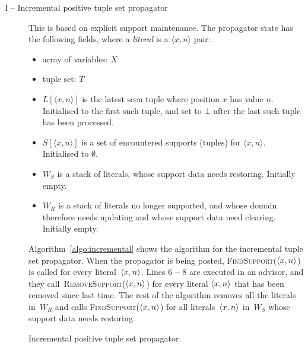 \documentclass[a4paper,11pt]{article}
\newcommand{\Algoref}[1]{Algorithm~\ref{#1}}
\newcommand{\Extensional}{\Constraint{Extensional}~}
\newcommand{\FOREACH}[1]{\FORALL{{#1} \textbf{do}}}
\newcommand{\ENDFOREACH}{\ENDFOR}
\def\PROCEDURE{\item[\textbf{PROCEDURE}]}
\def\bool{\mathit{bool}}
\def\FindSupport{\textsc{FindSupport}}
\def\RemoveSupport{\textsc{RemoveSupport}}
\def\Extensional{\textsc{Extensional}}
\numberwithin{equation}{section}
\begin{document}
\begin{description}
   \item[I -- Incremental positive tuple set propagator]
     This is based on explicit support maintenance.  The propagator state
has the following fields, where a \emph{literal} is a $\langle x,n
\rangle$ pair:

\begin{itemize}
\item array of variables: $X$
\item tuple set: $T$
\item $L[\langle x,n \rangle]$ is the latest seen tuple where position
  $x$ has value $n$.  Initialised to the first such tuple, and set to
  $\bot$ after the last such tuple has been processed.
\item $S[\langle x,n \rangle]$ is a set of encountered supports
  (tuples) for $\langle x,n \rangle$.  Initialised to $\emptyset$.
\item $W_S$ is a stack of literals, whose support data needs restoring.
  Initially empty.
\item $W_R$ is a stack of literals no longer supported, and
  whose domain therefore needs updating and whose support data need clearing.
  Initially empty.
\end{itemize}

\Algoref{algo:incremental} shows the algorithm for the incremental
tuple set propagator. When the propagator is being posted,
\FindSupport($\left\langle x,n\right\rangle$) 
is called for every literal~$\left\langle x,n\right\rangle$.
Lines $6-8$ are executed in an advisor, and they call~\RemoveSupport($\left\langle x,n\right\rangle$)
for every literal $\left\langle x,n\right\rangle$ that has been removed since last time.
The rest of the algorithm removes all the literals in~$W_R$ and calls
\FindSupport($\left\langle x,n\right\rangle$) for all literals~$\left\langle x,n\right\rangle$ in~$W_S$ whose
support data needs restoring.

\begin{algorithm}[H]
\caption{Incremental positive tuple set propagator.}
\label{algo:incremental}
\end{algorithm}


\end{description}
\end{document}
